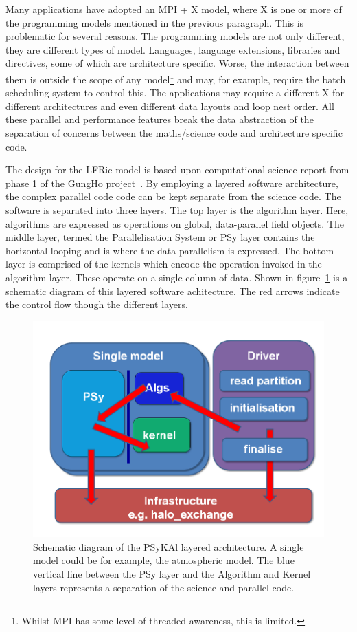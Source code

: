 \documentclass[review,times]{elsarticle}
\begin{document}
Many applications have adopted an MPI + X model, where X is one or
more of the programming models mentioned in the previous paragraph. This
is problematic for several reasons. The programming models are not
only different, they are different types of model. Languages, language
extensions, libraries and directives, some of which are architecture
specific. Worse, the interaction between them is outside the scope of
any model\footnote{Whilst MPI has some level of threaded awareness,
  this is limited.} and may, for example, require the batch scheduling
system to control this. The applications may require a different X for
different architectures and even different data layouts and
loop nest order. All these parallel and performance features
break the data abstraction of the separation of concerns between the
maths/science code and architecture specific code.

The design for the LFRic model is based upon computational science
report from phase 1 of the GungHo project~\cite{GHP1_CSR}. By
employing a layered software architecture, the complex parallel code
code can be kept separate from the science code. The software is
separated into three layers. The top layer is the algorithm
layer. Here, algorithms are expressed as operations on global,
data-parallel field objects. The middle layer, termed the
Parallelisation System or PSy layer contains the horizontal looping
and is where the data parallelism is expressed.  The bottom layer is
comprised of the kernels which encode the operation invoked in the
algorithm layer. These operate on a single column of data. 
Shown in figure~\ref{fig:psykal} is a schematic diagram of this
layered software achitecture. The red arrows indicate the control flow
though the different layers. 

\begin{figure}
\centering\includegraphics[width=0.8\linewidth]{PSyKAl.pdf}
\caption{\label{fig:psykal} Schematic diagram of the PSyKAl layered
  architecture. A single model could be for example, the atmospheric
  model. The blue vertical line between the PSy layer and the
  Algorithm and Kernel layers represents a separation of the science
  and parallel code.}
\end{figure}
\end{document}
